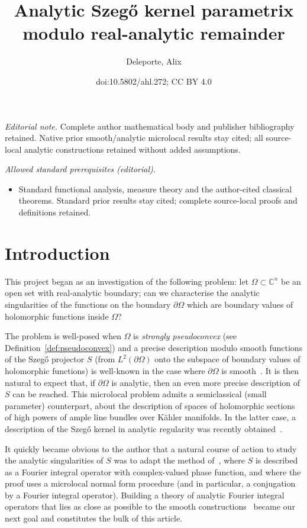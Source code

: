 \documentclass[10pt]{amsart}
\title{Analytic Szegő kernel parametrix modulo real-analytic remainder}
\author{Deleporte, Alix}
\date{doi:10.5802/ahl.272; CC BY 4.0}
\theoremstyle{definition}\newtheorem{defi}[theo]{Definition}\newtheorem{rema}[theo]{Remark}\newtheorem{exam}[theo]{Example}\newtheorem{exem}[theo]{Example}\newtheorem{nota}[theo]{Notation}
\newcommand\1{\mathds{1}}
\newcommand{\C}{\mathbb{C}}
\begin{document}
\maketitle
\noindent\textit{Editorial note.} Complete author mathematical body and publisher bibliography retained. Native prior smooth/analytic microlocal results stay cited; all source-local analytic constructions retained without added assumptions.\par\medskip
\noindent\textit{Allowed standard prerequisites (editorial).}\begin{itemize}
\item Standard functional analysis, measure theory and the author-cited classical theorems. Standard prior results stay cited; complete source-local proofs and definitions retained.
\end{itemize}\medskip

\section{Introduction}
\label{sec:introduction}
This project began as an investigation of the following problem: let $\Omega\subset \C^n$ be an open set with real-analytic boundary; can we characterise the analytic singularities of the functions on the boundary $\partial \Omega$ which are boundary values of holomorphic functions inside $\Omega$?

The problem is well-posed when $\Omega$ is \emph{strongly pseudoconvex} (see Definition~\ref{def:pseudoconvex}) and a precise description modulo smooth functions of the Szeg\H{o} projector $S$ (from $L^2(\partial \Omega)$ onto the subspace of boundary values of holomorphic functions) is well-known in the case where $\partial \Omega$ is smooth~\cite{boutet_de_monvel_sur_1975,fefferman_bergman_1976}. It is then natural to expect that, if $\partial \Omega$ is analytic, then an even more precise description of $S$ can be reached. This microlocal problem admits a semiclassical (small parameter) counterpart, about the description of spaces of holomorphic sections of high powers of ample line bundles over K\"ahler manifolds. In the latter case, a description of the Szeg\H{o} kernel in analytic regularity was recently obtained~\cite{charles_analytic_2021,deleporte_toeplitz_2018,deleporte_direct_2024,hezari_off-diagonal_2017,hezari_property_2021,rouby_analytic_2018}.

It quickly became obvious to the author that a natural course of action to study the analytic singularities of $S$ was to adapt the method of~\cite{boutet_de_monvel_sur_1975}, where $S$ is described as a {Fourier integral operator} with complex-valued phase function, and where the proof uses a microlocal normal form procedure (and in particular, a conjugation by a {Fourier integral operator}). Building a theory of analytic {Fourier integral operators} that lies as close as possible to the smooth constructions~\cite{hormander_analysis_1985} became our next goal and constitutes the bulk of this article.
\end{document}
